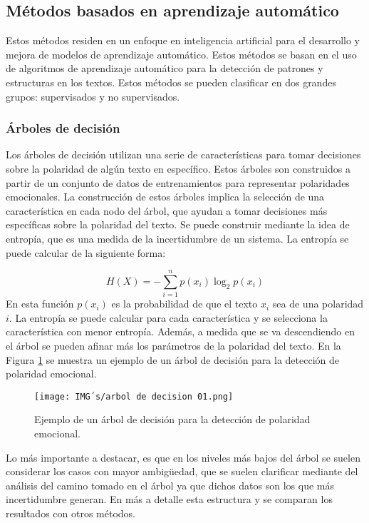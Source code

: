 \documentclass[12pt, conference]{IEEEtran}
\begin{document}
\subsection{Métodos basados en aprendizaje automático}

Estos métodos residen en un enfoque en inteligencia artificial para el desarrollo y mejora de modelos de aprendizaje automático. Estos métodos se basan en el uso de algoritmos de aprendizaje automático para la detección de patrones y estructuras en los textos. Estos métodos se pueden clasificar en dos grandes grupos: supervisados y no supervisados.

\subsubsection{Árboles de decisión}

Los árboles de decisión utilizan una serie de características para tomar decisiones sobre la polaridad de algún texto en específico. Estos árboles son construidos a partir de un conjunto de datos de entrenamientos para representar polaridades emocionales. La construcción de estos árboles implica la selección de una característica en cada nodo del árbol, que ayudan a tomar decisiones más específicas sobre la polaridad del texto. Se puede construir mediante la idea de entropía, que es una medida de la incertidumbre de un sistema. La entropía se puede calcular de la siguiente forma:

\begin{equation}
  H(X) = -\sum_{i=1}^{n} p(x_i) \log_2 p(x_i)
\end{equation}
En esta función $p(x_i)$ es la probabilidad de que el texto $x_i$ sea de una polaridad $i$. La entropía se puede calcular para cada característica y se selecciona la característica con menor entropía.
Además, a medida que se va descendiendo en el árbol se pueden afinar más los parámetros de la polaridad del texto. En la Figura \ref{fig10} se muestra un ejemplo de un árbol de decisión para la detección de polaridad emocional.
\begin{figure}
  \centering
  \texttt{[image: IMG´s/arbol de decision 01.png]}
  \caption{Ejemplo de un árbol de decisión para la detección de polaridad emocional.}
  \label{fig10}
\end{figure}

Lo más importante a destacar, es que en los niveles más bajos del árbol se suelen considerar los casos con mayor ambig\"uedad, que se suelen clarificar mediante del análisis del camino tomado en el árbol ya que dichos datos son los que más incertidumbre generan. En \cite{f14} más a detalle esta estructura y se comparan los resultados con otros métodos.
\end{document}
